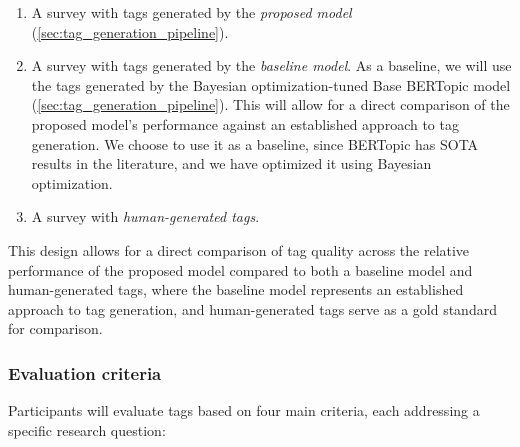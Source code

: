 \begin{enumerate}
\item A survey with tags generated by the \textit{proposed model} (\cref{sec:tag_generation_pipeline}).
\item A survey with tags generated by the \textit{baseline model}. As a baseline, we will use the tags generated by the Bayesian optimization-tuned Base BERTopic model (\cref{sec:tag_generation_pipeline}). This will allow for a direct comparison of the proposed model's performance against an established approach to tag generation. We choose to use it as a baseline, since BERTopic has SOTA results in the literature, and we have optimized it using Bayesian optimization.
\item A survey with \textit{human-generated tags}.
\end{enumerate}

This design allows for a direct comparison of tag quality across the relative performance of the proposed model compared to both a baseline model and human-generated tags, where the baseline model represents an established approach to tag generation, and human-generated tags serve as a gold standard for comparison.

\subsubsection{Evaluation criteria}
Participants will evaluate tags based on four main criteria, each addressing a specific research question:

